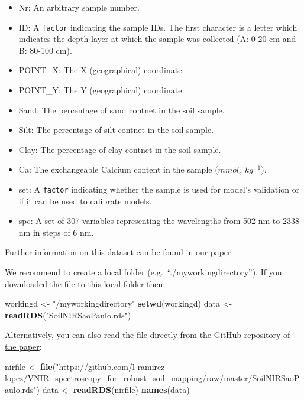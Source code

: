 \documentclass[]{book}
\newenvironment{Shaded}{\begin{snugshade}}{\end{snugshade}}
\newcommand{\KeywordTok}[1]{\textcolor[rgb]{0.13,0.29,0.53}{\textbf{#1}}}
\newcommand{\NormalTok}[1]{#1}
\newcommand{\StringTok}[1]{\textcolor[rgb]{0.31,0.60,0.02}{#1}}
\providecommand{\tightlist}{%
  \setlength{\itemsep}{0pt}\setlength{\parskip}{0pt}}
\begin{document}
\begin{itemize}
\tightlist
\item
  Nr: An arbitrary sample number.
\item
  ID: A \texttt{factor} indicating the sample IDs. The first character is a letter which indicates the depth layer at which the sample was collected (A: 0-20 cm and B: 80-100 cm).\\
\item
  POINT\_X: The X (geographical) coordinate.
\item
  POINT\_Y: The Y (geographical) coordinate.
\item
  Sand: The percentage of sand contnet in the soil sample.
\item
  Silt: The percentage of silt contnet in the soil sample.
\item
  Clay: The percentage of clay contnet in the soil sample.
\item
  Ca: The exchangeable Calcium content in the sample (\(mmol_{c}\) \(kg^{−1}\)).
\item
  set: A \texttt{factor} indicating whether the sample is used for model's validation or if it can be used to calibrate models.
\item
  spc: A set of 307 variables representing the wavelengths from 502 nm to 2338 nm in steps of 6 nm.
\end{itemize}

Further information on this dataset can be found in \href{https://onlinelibrary.wiley.com/doi/epdf/10.1111/ejss.12752}{our paper}

We recommend to create a local folder (e.g.~``./myworkingdirectory''). If you downloaded the file to this local folder then:

\begin{Shaded}
\begin{Highlighting}[]
\NormalTok{workingd <-}\StringTok{ "/myworkingdirectory"}
\KeywordTok{setwd}\NormalTok{(workingd)}
\NormalTok{data <-}\StringTok{ }\KeywordTok{readRDS}\NormalTok{(}\StringTok{"SoilNIRSaoPaulo.rds"}\NormalTok{)}
\end{Highlighting}
\end{Shaded}

Alternatively, you can also read the file directly from the \href{https://github.com/l-ramirez-lopez/VNIR_spectroscopy_for_robust_soil_mapping}{GitHub repository of the paper}:

\begin{Shaded}
\begin{Highlighting}[]
\NormalTok{nirfile <-}\StringTok{ }\KeywordTok{file}\NormalTok{(}\StringTok{"https://github.com/l-ramirez-lopez/VNIR_spectroscopy_for_robust_soil_mapping/raw/master/SoilNIRSaoPaulo.rds"}\NormalTok{)}
\NormalTok{data <-}\StringTok{ }\KeywordTok{readRDS}\NormalTok{(nirfile)}
\KeywordTok{names}\NormalTok{(data)}
\end{Highlighting}
\end{Shaded}
\end{document}
